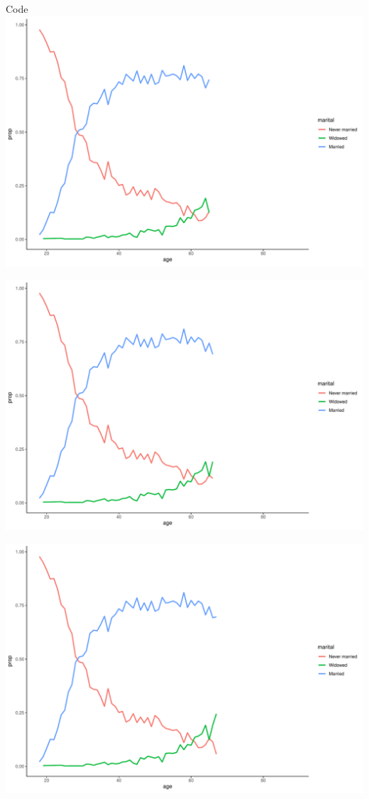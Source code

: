 \documentclass[
  ignorenonframetext,
]{beamer}
\begin{document}
\begin{frame}[fragile]{Code}
\includegraphics{gss_cat_files/figure-beamer/unnamed-chunk-1-71.pdf}

\includegraphics{gss_cat_files/figure-beamer/unnamed-chunk-1-72.pdf}

\includegraphics{gss_cat_files/figure-beamer/unnamed-chunk-1-73.pdf}


\end{frame}
\end{document}
